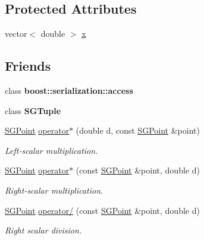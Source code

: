 \subsection*{Protected Attributes}
\begin{DoxyCompactItemize}
\item 
vector$<$ double $>$ \hyperlink{classSGPoint_ae4b95f14f367daa07dc982c5bed53a7a}{x}
\end{DoxyCompactItemize}
\subsection*{Friends}
\begin{DoxyCompactItemize}
\item 
\mbox{\label{classSGPoint_ac98d07dd8f7b70e16ccb9a01abf56b9c}} 
class {\bfseries boost\+::serialization\+::access}
\item 
\mbox{\label{classSGPoint_ad5f2d71f9c5e1cbf3ba9ed5ae3de7798}} 
class {\bfseries S\+G\+Tuple}
\item 
\mbox{\label{classSGPoint_a3c878d936b6e5255b1b1b8aedc61e86b}} 
\hyperlink{classSGPoint}{S\+G\+Point} \hyperlink{classSGPoint_a3c878d936b6e5255b1b1b8aedc61e86b}{operator$\ast$} (double d, const \hyperlink{classSGPoint}{S\+G\+Point} \&point)
\begin{DoxyCompactList}\small\item\em Left-\/scalar multiplication. \end{DoxyCompactList}\item 
\mbox{\label{classSGPoint_a6744606b8f8713122dd7a1cf322f9af1}} 
\hyperlink{classSGPoint}{S\+G\+Point} \hyperlink{classSGPoint_a6744606b8f8713122dd7a1cf322f9af1}{operator$\ast$} (const \hyperlink{classSGPoint}{S\+G\+Point} \&point, double d)
\begin{DoxyCompactList}\small\item\em Right-\/scalar multiplication. \end{DoxyCompactList}\item 
\mbox{\label{classSGPoint_ad112619c55afac0b026c236a9901e001}} 
\hyperlink{classSGPoint}{S\+G\+Point} \hyperlink{classSGPoint_ad112619c55afac0b026c236a9901e001}{operator/} (const \hyperlink{classSGPoint}{S\+G\+Point} \&point, double d)
\begin{DoxyCompactList}\small\item\em Right scalar division. \end{DoxyCompactList}\item 

\end{DoxyCompactItemize}
